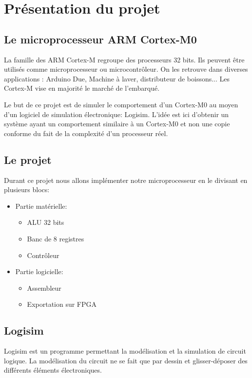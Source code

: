 \section{Présentation du projet}
\subsection{Le microprocesseur ARM Cortex-M0}
	La famille des ARM Cortex-M regroupe des processeurs 32 bits. Ils peuvent être utilisés comme microprocesseur ou microcontrôleur. On les retrouve dans diverses applications : Arduino Due,  Machine à laver, distributeur de boissons...  Les Cortex-M vise en majorité le marché de l'embarqué.

	Le but de ce projet est de simuler le comportement d'un Cortex-M0 au moyen d'un logiciel de simulation électronique: Logisim. L'idée est ici d'obtenir un système ayant un comportement similaire à un Cortex-M0 et non une copie conforme du fait de la complexité d'un processeur réel.

\subsection{Le projet}
	Durant ce projet nous allons implémenter notre microprocesseur en le divisant en plusieurs blocs:
\begin{itemize}
	\item Partie matérielle:
	\begin{itemize}
		\item ALU 32 bits
		\item Banc de 8 registres
		\item Contrôleur
	\end{itemize}
	\item Partie logicielle:
	\begin{itemize}
		\item Assembleur
		\item Exportation sur FPGA
	\end{itemize}
\end{itemize}

\subsection{Logisim}

Logisim est un programme permettant la modélisation et la simulation de circuit logique. La modélisation du circuit ne se fait que par dessin et glisser-déposer des différents éléments électroniques.

